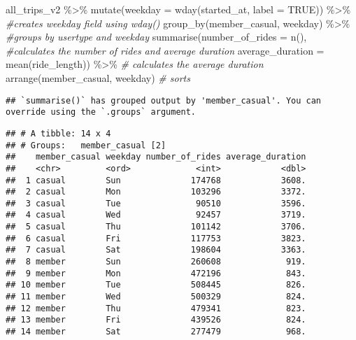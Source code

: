 \documentclass[
]{article}
\newenvironment{Shaded}{\begin{snugshade}}{\end{snugshade}}
\newcommand{\AttributeTok}[1]{\textcolor[rgb]{0.77,0.63,0.00}{#1}}
\newcommand{\CommentTok}[1]{\textcolor[rgb]{0.56,0.35,0.01}{\textit{#1}}}
\newcommand{\ConstantTok}[1]{\textcolor[rgb]{0.00,0.00,0.00}{#1}}
\newcommand{\FunctionTok}[1]{\textcolor[rgb]{0.00,0.00,0.00}{#1}}
\newcommand{\NormalTok}[1]{#1}
\newcommand{\SpecialCharTok}[1]{\textcolor[rgb]{0.00,0.00,0.00}{#1}}
\begin{document}
\begin{Shaded}
\begin{Highlighting}[]
\NormalTok{all\_trips\_v2 }\SpecialCharTok{\%\textgreater{}\%} 
  \FunctionTok{mutate}\NormalTok{(}\AttributeTok{weekday =} \FunctionTok{wday}\NormalTok{(started\_at, }\AttributeTok{label =} \ConstantTok{TRUE}\NormalTok{)) }\SpecialCharTok{\%\textgreater{}\%}  \CommentTok{\#creates weekday field using wday()}
  \FunctionTok{group\_by}\NormalTok{(member\_casual, weekday) }\SpecialCharTok{\%\textgreater{}\%}  \CommentTok{\#groups by usertype and weekday}
  \FunctionTok{summarise}\NormalTok{(}\AttributeTok{number\_of\_rides =} \FunctionTok{n}\NormalTok{(),                          }\CommentTok{\#calculates the number of rides and average duration }
  \AttributeTok{average\_duration =} \FunctionTok{mean}\NormalTok{(ride\_length)) }\SpecialCharTok{\%\textgreater{}\%}         \CommentTok{\# calculates the average duration}
  \FunctionTok{arrange}\NormalTok{(member\_casual, weekday)                               }\CommentTok{\# sorts}
\end{Highlighting}
\end{Shaded}

\begin{verbatim}
## `summarise()` has grouped output by 'member_casual'. You can override using the `.groups` argument.
\end{verbatim}

\begin{verbatim}
## # A tibble: 14 x 4
## # Groups:   member_casual [2]
##    member_casual weekday number_of_rides average_duration
##    <chr>         <ord>             <int>            <dbl>
##  1 casual        Sun              174768            3608.
##  2 casual        Mon              103296            3372.
##  3 casual        Tue               90510            3596.
##  4 casual        Wed               92457            3719.
##  5 casual        Thu              101142            3706.
##  6 casual        Fri              117753            3823.
##  7 casual        Sat              198604            3363.
##  8 member        Sun              260608             919.
##  9 member        Mon              472196             843.
## 10 member        Tue              508445             826.
## 11 member        Wed              500329             824.
## 12 member        Thu              479341             823.
## 13 member        Fri              439526             824.
## 14 member        Sat              277479             968.
\end{verbatim}
\end{document}

